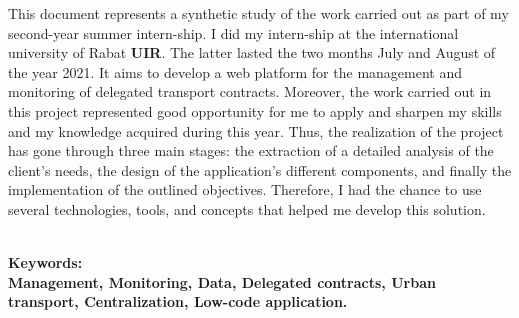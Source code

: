 \documentclass[a4paper]{report}
\begin{document}
\begin{doublespace}

    This document represents a synthetic study of the work carried out as part
    of my second-year summer intern-ship.
    I did my intern-ship at the international university of Rabat \textbf{UIR}.
    The latter lasted the two months
    July and August of the year 2021. It aims to develop a web platform for the
    management and monitoring of
    delegated transport contracts. Moreover, the work carried out in this
    project represented good opportunity
    for me to apply and sharpen my skills and my knowledge acquired during this
    year. Thus, the realization
    of the project has gone through three main stages: the extraction of a
    detailed analysis of the client's
    needs, the design of the application's different components, and finally
    the implementation of the outlined objectives.
    Therefore, I had the chance to use several technologies, tools, and
    concepts that helped me develop this solution.

    \textbf{\\Keywords:\\Management, Monitoring, Data, Delegated contracts,
        Urban transport, Centralization, Low-code application.}

\end{doublespace}

\newpage

\renewcommand{\contentsname}{Table de matières}
\setcounter{tocdepth}{4}
\tableofcontents

\cleardoublepage
\end{document}
